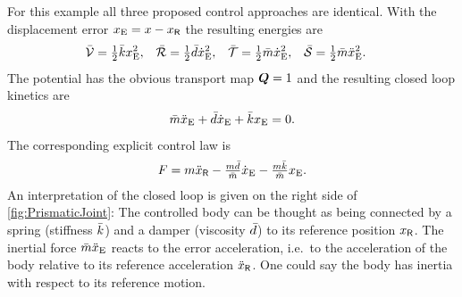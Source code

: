 For this example all three proposed control approaches are identical.
With the displacement error $x_{\mathrm{E}} = x - x_{\mathsf{R}}$ the resulting energies are
\begin{align}
 \bar{\mathcal{V}} &= \tfrac{1}{2} \bar{k} x_{\mathrm{E}}^2,&
 \bar{\mathcal{R}} &= \tfrac{1}{2} \bar{d} \dot{x}_{\mathrm{E}}^2,&
 \bar{\mathcal{T}} &= \tfrac{1}{2} \bar{m} \dot{x}_{\mathrm{E}}^2,&
 \bar{\mathcal{S}} &= \tfrac{1}{2} \bar{m} \ddot{x}_{\mathrm{E}}^2.
\end{align}
The potential has the obvious transport map $\boldsymbol{Q} = 1$ and the resulting closed loop kinetics are
\begin{align}
 \bar{m} \ddot{x}_{\mathrm{E}} + \bar{d} \dot{x}_{\mathrm{E}} + \bar{k} x_{\mathrm{E}} = 0.
\end{align}
The corresponding explicit control law is
\begin{align}
 F = m \ddot{x}_{\mathsf{R}} - \tfrac{m \bar{d}}{\bar{m}} \dot{x}_{\mathrm{E}} - \tfrac{m \bar{k}}{\bar{m}} x_{\mathrm{E}}.
\end{align}
An interpretation of the closed loop is given on the right side of \autoref{fig:PrismaticJoint}:
The controlled body can be thought as being connected by a spring (stiffness $\bar{k}$) and a damper (viscosity $\bar{d}$) to its reference position $x_{\mathsf{R}}$.
The inertial force $\bar{m} \ddot{x}_{\mathrm{E}}$ reacts to the error acceleration, i.e.\ to the acceleration of the body relative to its reference acceleration $\ddot{x}_{\mathsf{R}}$.
One could say the body has inertia with respect to its reference motion.
